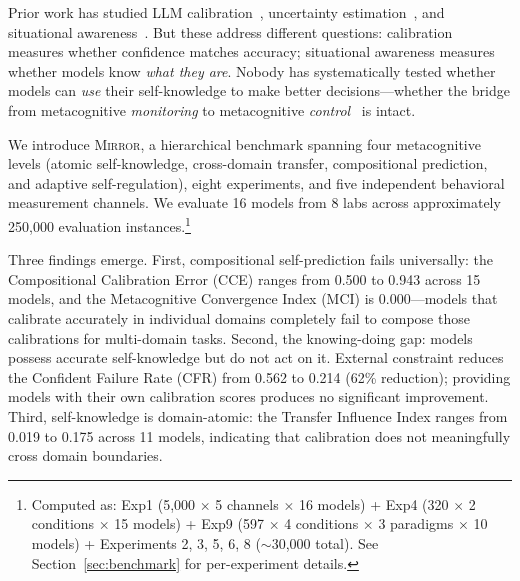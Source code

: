\documentclass[10pt]{article}
\newcommand{\mirror}{\textsc{Mirror}}
\newcommand{\MCI}{MCI}
\newcommand{\CCE}{CCE}
\newcommand{\CFR}{CFR}
\begin{document}
Prior work has studied LLM calibration~\citep{kadavath2022language,
kapoor2024calibration}, uncertainty estimation~\citep{lin2024generating}, and
situational awareness~\citep{laine2024me}. But these address different questions:
calibration measures whether confidence matches accuracy; situational awareness
measures whether models know \textit{what they are}. Nobody has systematically
tested whether models can \textit{use} their self-knowledge to make better
decisions---whether the bridge from metacognitive \textit{monitoring} to
metacognitive \textit{control}~\citep{nelson1990metamemory} is intact.

We introduce \mirror{}, a hierarchical benchmark spanning four metacognitive levels
(atomic self-knowledge, cross-domain transfer, compositional prediction, and
adaptive self-regulation), eight experiments, and five independent behavioral
measurement channels. We evaluate 16 models from 8 labs across approximately
250,000 evaluation instances.\footnote{Computed as: Exp1 (5,000 $\times$ 5 channels $\times$ 16 models) + Exp4 (320 $\times$ 2 conditions $\times$ 15 models) + Exp9 (597 $\times$ 4 conditions $\times$ 3 paradigms $\times$ 10 models) + Experiments 2, 3, 5, 6, 8 ($\sim$30,000 total). See Section~\ref{sec:benchmark} for per-experiment details.}

Three findings emerge. First, compositional self-prediction fails universally: the Compositional Calibration Error (\CCE{}) ranges from 0.500 to 0.943 across
15 models, and the Metacognitive Convergence Index (\MCI{}) is 0.000---models
that calibrate accurately in individual domains completely fail to
compose those calibrations for multi-domain tasks. Second, the knowing-doing gap:
models possess accurate self-knowledge but do not act on it. External constraint
reduces the Confident Failure Rate (\CFR{}) from 0.562 to 0.214 (62\% reduction);
providing models with their own calibration scores produces no significant
improvement. Third, self-knowledge is domain-atomic: the Transfer Influence Index
ranges from 0.019 to 0.175 across 11 models, indicating that calibration does not
meaningfully cross domain boundaries.
\end{document}
